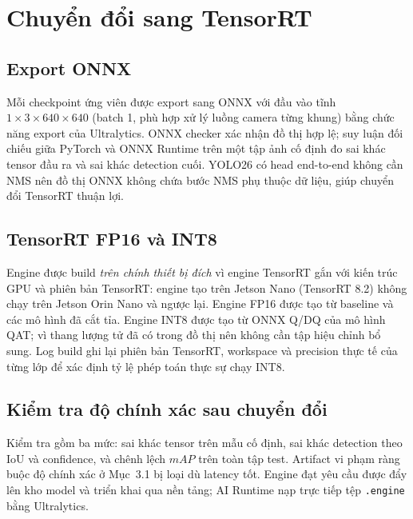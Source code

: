 \section{Chuyển đổi sang TensorRT}

\subsection{Export ONNX}

Mỗi checkpoint ứng viên được export sang ONNX với đầu vào tĩnh
$1\times3\times640\times640$ (batch 1, phù hợp xử lý luồng camera từng khung)
bằng chức năng export của Ultralytics. ONNX checker xác nhận đồ thị hợp lệ; suy
luận đối chiếu giữa PyTorch và ONNX Runtime trên một tập ảnh cố định đo sai khác
tensor đầu ra và sai khác detection cuối. YOLO26 có head end-to-end không cần NMS
nên đồ thị ONNX không chứa bước NMS phụ thuộc dữ liệu, giúp chuyển đổi TensorRT
thuận lợi.

\subsection{TensorRT FP16 và INT8}

Engine được build \emph{trên chính thiết bị đích} vì engine TensorRT gắn với
kiến trúc GPU và phiên bản TensorRT: engine tạo trên Jetson Nano (TensorRT 8.2)
không chạy trên Jetson Orin Nano và ngược lại. Engine FP16 được tạo từ baseline và
các mô hình đã cắt tỉa. Engine INT8 được tạo từ ONNX Q/DQ của mô hình QAT; vì
thang lượng tử đã có trong đồ thị nên không cần tập hiệu chỉnh bổ sung. Log build
ghi lại phiên bản TensorRT, workspace và precision thực tế của từng lớp để xác định
tỷ lệ phép toán thực sự chạy INT8.

\subsection{Kiểm tra độ chính xác sau chuyển đổi}

Kiểm tra gồm ba mức: sai khác tensor trên mẫu cố định, sai khác detection theo
IoU và confidence, và chênh lệch $mAP$ trên toàn tập test. Artifact vi phạm ràng
buộc độ chính xác ở Mục~3.1 bị loại dù latency tốt. Engine đạt yêu cầu được đẩy
lên kho model và triển khai qua nền tảng; AI Runtime nạp trực tiếp tệp
\texttt{.engine} bằng Ultralytics.
